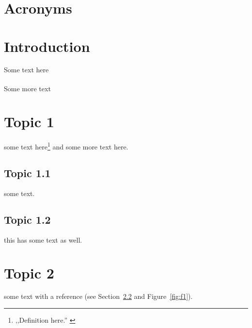 \documentclass[12pt,a4paper]{article}
\begin{document}
	\newpage %



	\section*{Acronyms}
	\begin{acronym}[NSM] %
	\end{acronym}

	\newpage %

	\fancyhead[CO,CE]{\rightmark} %

	\renewcommand{\thepage}{\arabic{page}}
	\setcounter{page}{1}
	\renewcommand{\thesection}{\arabic{section}}
	\setcounter{section}{0}

	\section{Introduction}
	Some text here \\[6pt]
	\\[6pt]
	Some more text
	\newpage %

	\section{Topic 1}
	some text here\footnote{
		,,Definition here.'' \citep[see][p. 00]{acroname} %
	}
	and some more text here.

	\subsection{Topic 1.1}
	some text.

	\subsection{Topic 1.2}
	\label{sec:t1-2}
	this has some text as well.
	
	\section{Topic 2}
	some text with a reference (see Section~\ref{sec:t1-2} and Figure~\ref{fig:f1}).
\end{document}

